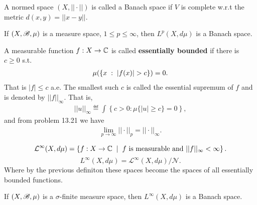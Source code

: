 \begin{definition}
    A normed space $(X,||\cdot||)$ is called a Banach space if $V$ is complete w.r.t the metric $d(x,y)=||x-y||$.
\end{definition}

\begin{theorem}
    If $(X,\mathscr{B},\mu)$ is a measure space, $1\leq p\leq \infty$, then $L^p(X,d\mu)$ is a Banach space.
\end{theorem}

\begin{definition}
    A measurable function $f:X\rightarrow \mathbb{C}$ is called \textbf{essentially bounded} if there is $c\geq 0$ s.t. 
    \begin{align}
    \mu(\left\{ x\omm:\omm |f(x)|>c \right\})=0.    
    \end{align}
    That is $|f|\leq c$ a.e. The smallest such $c$ is called the essential supremum of $f$ and is denoted by $||f||_\infty.$ That is,
    \begin{align*}
        ||u||_{\infty} \eqdef \int\left\{c>0:\mu\{|u|\geq c\}=0\right\},
    \end{align*}
    and from problem 13.21 we have
    \begin{align*}
        \lim\limits_{p\rightarrow\infty} ||\cdot ||_p = ||\cdot||_{\infty}.
    \end{align*}
\end{definition}

\begin{definition}
    $$\mathcal L^\infty(X,d\mu) = \left\{ f:X\rightarrow \mathbb{C}\hspace{2mm}|\hspace{2mm} f\text{ is measurable and }||f||_\infty <\infty \right\}.$$
    $$L^\infty (X,d\mu) =\mathcal L^\infty(X,d\mu)/\mathcal N. $$
    Where by the previous definiton these spaces become the spaces of all essentially bounded functions. 
\end{definition}
\begin{theorem}
    If $(X,\mathscr{B},\mu)$ is a $\sigma$-finite measure space, then $L^\infty(X,d\mu)$ is a Banach space.
\end{theorem}
